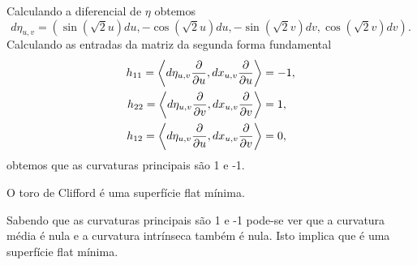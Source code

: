 \begin{demonstracao}
	Calculando a diferencial de $\eta$ obtemos
	\begin{equation*}
	d\eta_{u,v} = \left(\sin(\sqrt{2} u) du, -\cos(\sqrt{2} u) du, -\sin(\sqrt{2} v) dv, \cos(\sqrt{2} v) dv\right).
	\end{equation*}
	Calculando as entradas da matriz da segunda forma fundamental
	\begin{align*}
	h_{11} = \left\langle d\eta_{u,v} \frac{\partial}{\partial u},dx_{u,v} \frac{\partial}{\partial u} \right\rangle &= -1,\\
	h_{22} = \left\langle d\eta_{u,v} \frac{\partial}{\partial v},dx_{u,v} \frac{\partial}{\partial v} \right\rangle &= 1,\\
	h_{12} = \left\langle d\eta_{u,v} \frac{\partial}{\partial u},dx_{u,v} \frac{\partial}{\partial v} \right\rangle &= 0,
	\end{align*}
	obtemos que as curvaturas principais são 1 e -1.
\end{demonstracao}

\begin{proposicao}
	O toro de Clifford é uma superfície flat mínima.
\end{proposicao}

\begin{demonstracao}
	Sabendo que as curvaturas principais são 1 e -1 pode-se ver que a curvatura média é nula e a curvatura intrínseca também é nula. Isto implica que é uma superfície flat mínima.
\end{demonstracao}

